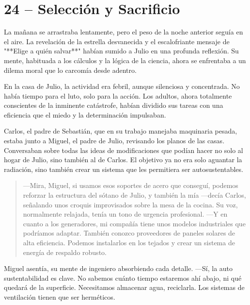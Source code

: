 \documentclass[a4paper,12pt]{book}
\begin{document}
\cleardoublepage %

\chapter*{24 – Selección y Sacrificio}

La mañana se arrastraba lentamente, pero el peso de la noche anterior seguía en el aire. La revelación de la estrella desvanecida y el escalofriante mensaje de "**Elige a quién salvar**" habían sumido a Julio en una profunda reflexión. Su mente, habituada a los cálculos y la lógica de la ciencia, ahora se enfrentaba a un dilema moral que lo carcomía desde adentro.

En la casa de Julio, la actividad era febril, aunque silenciosa y concentrada. No había tiempo para el luto, solo para la acción. Los adultos, ahora totalmente conscientes de la inminente catástrofe, habían dividido sus tareas con una eficiencia que el miedo y la determinación impulsaban.

Carlos, el padre de Sebastián, que en su trabajo manejaba maquinaria pesada, estaba junto a Miguel, el padre de Julio, revisando los planos de las casas. Conversaban sobre todas las ideas de modificaciones que podían hacer no solo al hogar de Julio, sino también al de Carlos. El objetivo ya no era solo aguantar la radiación, sino también crear un sistema que les permitiera ser autosustentables.

\begin{quote}
    —Mira, Miguel, si usamos esos soportes de acero que conseguí, podemos reforzar la estructura del sótano de Julio, y también la mía —decía Carlos, señalando unos croquis improvisados sobre la mesa de la cocina. Su voz, normalmente relajada, tenía un tono de urgencia profesional. —Y en cuanto a los generadores, mi compañía tiene unos modelos industriales que podríamos adaptar. También conozco proveedores de paneles solares de alta eficiencia. Podemos instalarlos en los tejados y crear un sistema de energía de respaldo robusto.
\end{quote}

Miguel asentía, su mente de ingeniero absorbiendo cada detalle. —Sí, la auto sustentabilidad es clave. No sabemos cuánto tiempo estaremos ahí abajo, ni qué quedará de la superficie. Necesitamos almacenar agua, reciclarla. Los sistemas de ventilación tienen que ser herméticos.
\end{document}
